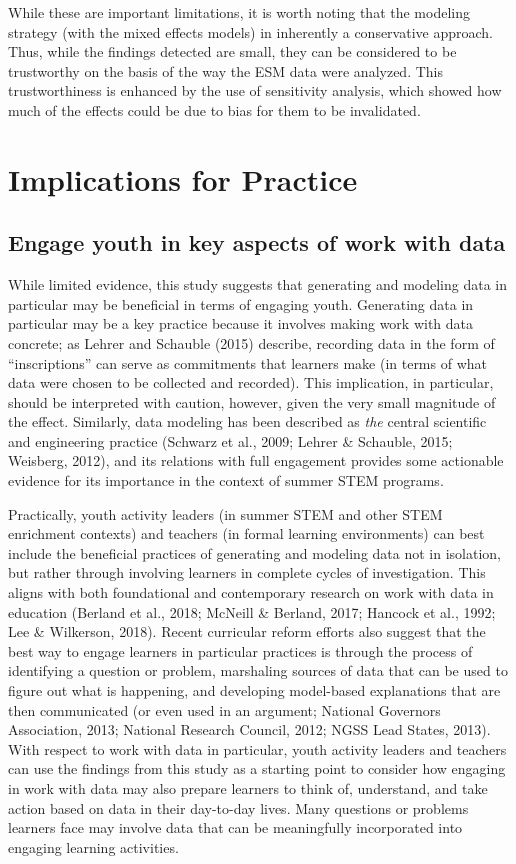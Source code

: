 \documentclass[]{msu-thesis}
\theoremstyle{definition}
\theoremstyle{definition}
\theoremstyle{definition}
\theoremstyle{remark}
\begin{document}
While these are important limitations, it is worth noting that the
modeling strategy (with the mixed effects models) in inherently a
conservative approach. Thus, while the findings detected are small, they
can be considered to be trustworthy on the basis of the way the ESM data
were analyzed. This trustworthiness is enhanced by the use of
sensitivity analysis, which showed how much of the effects could be due
to bias for them to be invalidated.

\section{Implications for Practice}\label{implications-for-practice}

\subsection{Engage youth in key aspects of work with
data}\label{engage-youth-in-key-aspects-of-work-with-data}

While limited evidence, this study suggests that generating and modeling
data in particular may be beneficial in terms of engaging youth.
Generating data in particular may be a key practice because it involves
making work with data concrete; as Lehrer and Schauble (2015) describe,
recording data in the form of ``inscriptions'' can serve as commitments
that learners make (in terms of what data were chosen to be collected
and recorded). This implication, in particular, should be interpreted
with caution, however, given the very small magnitude of the effect.
Similarly, data modeling has been described as \emph{the} central
scientific and engineering practice (Schwarz et al., 2009; Lehrer \&
Schauble, 2015; Weisberg, 2012), and its relations with full engagement
provides some actionable evidence for its importance in the context of
summer STEM programs.

Practically, youth activity leaders (in summer STEM and other STEM
enrichment contexts) and teachers (in formal learning environments) can
best include the beneficial practices of generating and modeling data
not in isolation, but rather through involving learners in complete
cycles of investigation. This aligns with both foundational and
contemporary research on work with data in education (Berland et al.,
2018; McNeill \& Berland, 2017; Hancock et al., 1992; Lee \& Wilkerson,
2018). Recent curricular reform efforts also suggest that the best way
to engage learners in particular practices is through the process of
identifying a question or problem, marshaling sources of data that can
be used to figure out what is happening, and developing model-based
explanations that are then communicated (or even used in an argument;
National Governors Association, 2013; National Research Council, 2012;
NGSS Lead States, 2013). With respect to work with data in particular,
youth activity leaders and teachers can use the findings from this study
as a starting point to consider how engaging in work with data may also
prepare learners to think of, understand, and take action based on data
in their day-to-day lives. Many questions or problems learners face may
involve data that can be meaningfully incorporated into engaging
learning activities.
\end{document}
